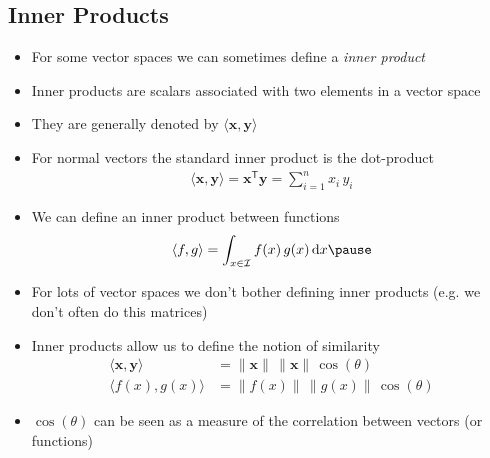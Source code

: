 \documentclass[11pt]{article}
\newcommand{\tr}{\textsf{T}}
\newcommand{\dd}{\mathrm{d}}
\begin{document}
\subsection{Inner Products}
\label{sec:orge5a6d42}
\begin{itemize}
\item For some vector spaces we can sometimes define a \emph{inner product}
\item Inner products are scalars associated with two elements in a vector space
\item They are generally denoted by \(\langle\bm{x},\bm{y}\rangle\)
\item For normal vectors the standard inner product is the dot-product
\begin{align*}
    \langle \bm{x}, \bm{y} \rangle = \bm{x}^\tr\bm{y} = \sum_{i=1}^n x_i\,y_i
\end{align*}
\item We can define an inner product between functions
\begin{align*}
  \langle f, g \rangle = \int_{x\in\mathcal{I}} f(x)\,g(x)\,\dd x\pause
\end{align*}
\item For lots of vector spaces we don't bother defining inner products 
(e.g. we don't often do this matrices)
\item Inner products allow us to define the notion of similarity
\begin{align*}
    \langle \bm{x}, \bm{y} \rangle &= \|\bm{x}\| \, \|\bm{x}\| \, \cos(\theta) \\
    \langle f(x), g(x) \rangle &= \|f(x)\| \, \|g(x)\|\, \cos(\theta)
\end{align*}
\item \(\cos(\theta)\) can be seen as a measure of the correlation between vectors (or functions)
\end{itemize}
\end{document}
